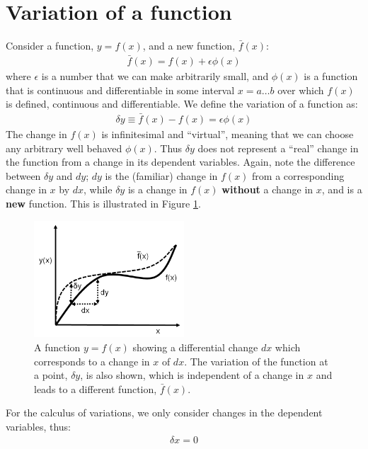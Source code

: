 \section{Variation of a function}
Consider a function, $y=f(x)$, and a new function, $\bar{f}(x)$:
\begin{align}
\bar{f}(x)=f(x)+\epsilon \phi(x)
\end{align}
where $\epsilon$ is a number that we can make arbitrarily small, and $\phi(x)$ is a function that is continuous and differentiable in some interval $x=a\dots b$ over which $f(x)$ is defined, continuous and differentiable. We define the variation of a function as:
\begin{align}
\label{eqn:vardef}
\delta y \equiv \bar{f}(x) -f(x) = \epsilon \phi(x)
\end{align}
The change in $f(x)$ is infinitesimal and ``virtual'', meaning that we can choose any arbitrary well behaved $\phi(x)$. Thus $\delta y$ does not represent a ``real'' change in the function from a change in its dependent variables. Again, note the difference between $\delta y$ and $dy$; $dy$ is the (familiar) change in $f(x)$ from a corresponding change in $x$ by $dx$, while $\delta y$ is a change in $f(x)$ \textbf{without} a change in $x$, and is a \textbf{new} function. This is illustrated in Figure \ref{fig:VirtualDisplacement}.
\begin{figure}[!h]
\center
\includegraphics[width=0.5\textwidth]{figures/VirtualDisplacement.png}
\caption{\label{fig:VirtualDisplacement}A function $y=f(x)$ showing a differential change $dx$ which corresponds to a change in $x$ of $dx$. The variation of the function at a point, $\delta y$, is also shown, which is independent of a change in $x$ and leads to a different function, $\bar{f}(x)$.}
\end{figure}
For the calculus of variations, we only consider changes in the dependent variables, thus:
\begin{align}
\delta x = 0
\end{align}


